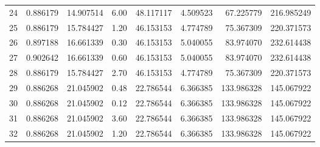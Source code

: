 \begin{tabular}{lrrrrrrr}
24 &  0.886179 &  14.907514 &  6.00 &  48.117117 &   4.509523 &   67.225779 &  216.985249 \\
25 &  0.886179 &  15.784427 &  1.20 &  46.153153 &   4.774789 &   75.367309 &  220.371573 \\
26 &  0.897188 &  16.661339 &  0.30 &  46.153153 &   5.040055 &   83.974070 &  232.614438 \\
27 &  0.902642 &  16.661339 &  0.60 &  46.153153 &   5.040055 &   83.974070 &  232.614438 \\
28 &  0.886179 &  15.784427 &  2.70 &  46.153153 &   4.774789 &   75.367309 &  220.371573 \\
29 &  0.886268 &  21.045902 &  0.48 &  22.786544 &   6.366385 &  133.986328 &  145.067922 \\
30 &  0.886268 &  21.045902 &  0.12 &  22.786544 &   6.366385 &  133.986328 &  145.067922 \\
31 &  0.886268 &  21.045902 &  3.60 &  22.786544 &   6.366385 &  133.986328 &  145.067922 \\
32 &  0.886268 &  21.045902 &  1.20 &  22.786544 &   6.366385 &  133.986328 &  145.067922 \\
\bottomrule
\end{tabular}
